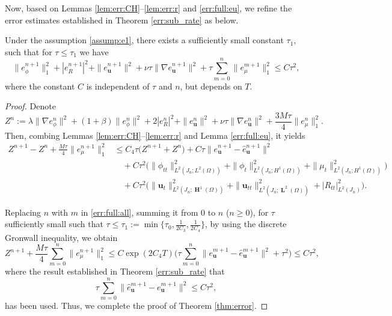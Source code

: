 Now, based on Lemmas \ref{lem:err:CH}--\ref{lem:err:r} and \ref{err:full:eu}, we refine the error estimates established in Theorem \ref{err:sub_rate} as below.
\begin{theorem} \label{thm:error}
	Under the assumption \eqref{assump:e1},  there exists a sufficiently small constant $\tau_1$, such that for $\tau \le \tau_1$ we have
	\begin{equation*}   
		\|e_\phi^{n+1}\|_1^2+|e_R^{n+1}|^2 +\|e_{\bm u}^{n+1}\|^2 +\nu \tau \|\nabla e_{\bm u}^{n+1}\|^2+  \tau \sum_{m=0}^{n} \|e_\mu^{m+1}\|_1^2  
		\le C\tau^2,
	\end{equation*}
	where the constant $C$ is independent of $\tau$ and $n$, but depends on $T$.
\end{theorem}
\begin{proof}
	Denote 
	\[
	Z^n:= \lambda \|\nabla e_\phi^n\|^2 + (1+\beta)\| e_\phi^n\|^2 + 2|e_R^n|^2+  \|e_{\bm u}^n\|^2 +\nu \tau \|\nabla e_{\bm u}^{n}\|^2 
	+ \frac{3M\tau}{4}\| e_\mu^n\|_1^2.
	\]
	Then, combing  Lemmas \ref {lem:err:CH}--\ref{lem:err:r} and Lemma \ref{err:full:eu}, it yields  
	\begin{equation}  \label{err:full:all}
		\begin{aligned}
			 Z^{n+1} - Z^n + \frac{M\tau}{4} \| e_\mu^{n+1}\|_1^2 
			& \leq C_4\tau \big(Z^{n+1}+   Z^{n}\big) + C\tau \|e_{\bm u}^{n+1}-\widehat{e}_{\bm u}^{n+1}\|^2    \\
			& \quad + C\tau^2\big(\|\phi_{tt}\|_{L^2(J_n ; L^2(\Omega))}^2+\|\phi_t\|_{L^2(J_n ; H^1(\Omega))}^2  +  \|\mu_t\|_{L^2(J_n ; H^1(\Omega))}^2\big)\\
			&  \quad + C\tau^2 \big(
			\|\bm u_t\|_{L^2(J_n ; \mbfH^1(\Omega))}^2+\|\bm u_{tt}\|_{L^2(J_n; \mbfL^2(\Omega))}^2+ |R_{tt}|_{L^2(J_n)}^2 \big).
		\end{aligned}
	\end{equation} 
	
	Replacing  $n$ with  $m$ in \eqref{err:full:all}, summing it from 0 to $n$ ($n \ge 0$),  for $\tau$ sufficiently small such that  $\tau \le  \tau_1:=\min\{\tau_0,\frac{1}{2C_3},\frac{1}{2C_4}\}$,  by using the discrete Gronwall inequality, we obtain 
	\begin{equation*}
			Z^{n+1} + \frac{M\tau}{4}\sum_{m=0}^{n}  \| e_\mu^{n+1}\|_1^2 
			\le C\exp(2C_4T) \big(\tau \sum_{m=0}^{n}  \|e_{\bm u}^{m+1}-\widehat{e}_{\bm u}^{m+1}\|^2 + \tau^2 \big) \le C \tau^2,
	\end{equation*}
	where the result established in Theorem \ref{err:sub_rate} that
	\begin{equation} \label{err:ehat_e}
		\tau\sum_{m=0}^{n} \|\widehat{e}_{\bm u}^{m+1}-{e}_{\bm u}^{m+1}\|^2  \leq C  \tau^2,
	\end{equation}
	has been used. Thus, we complete the proof of Theorem \ref{thm:error}.
\end{proof}
